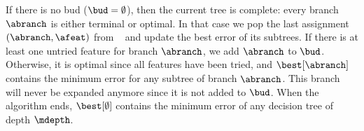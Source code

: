 \documentclass{article}
\begin{document}
If there is no bud ($\bud = \emptyset$), then the current tree is complete: every branch $\abranch$ is either terminal or optimal. In that case we pop the last assignment $(\abranch,\afeat)$ from \sequence\ 
and update the best error of its subtrees. If there is at least one untried feature for branch $\abranch$, we add $\abranch$ to $\bud$.
Otherwise, it is optimal since all features have been tried, and $\best[\abranch]$ contains the minimum error for any subtree of branch $\abranch$. 
This branch will never be expanded anymore since it is not added to $\bud$.
%
When the algorithm ends, $\best[\emptyset]$ contains the minimum error of any decision tree of depth $\mdepth$. %


%
%
%
\end{document}
